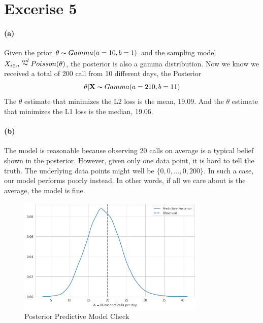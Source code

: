\documentclass[11pt, letterpaper]{article}
\begin{document}
\section{Excerise 5}
\paragraph{(a)}
Given the prior $\theta \thicksim Gamma(a=10, b=1)$ and the sampling model
$X_{i \in n} \overset{iid}{\thicksim} Poisson(\theta)$, the posterior is also a gamma distribution.
Now we know we received a total of 200 call from 10 different days, the Posterior
\[ \theta|\mathbf{X} \thicksim Gamma(a=210, b=11) \]
The $\theta$ estimate that minimizes the L2 loss is the mean, 19.09. And the $\theta$ estimate
that minimizes the L1 loss is the median, 19.06.

\paragraph{(b)}
The model is reasonable because observing 20 calls on average is a typical belief shown in the posterior.
However, given only one data point, it is hard to tell the truth. The underlying data points might well be
$\{0, 0, \dots, 0, 200\}$. In such a case, our model performs poorly instead. In other words, if all we
care about is the average, the model is fine.

\begin{figure}[!h]
  \centering
  \includegraphics[width=0.8\textwidth]{5.b.png}
  \captionsetup{justification=centering}
  \caption{Posterior Predictive Model Check}
\end{figure}
\newpage
\end{document}
